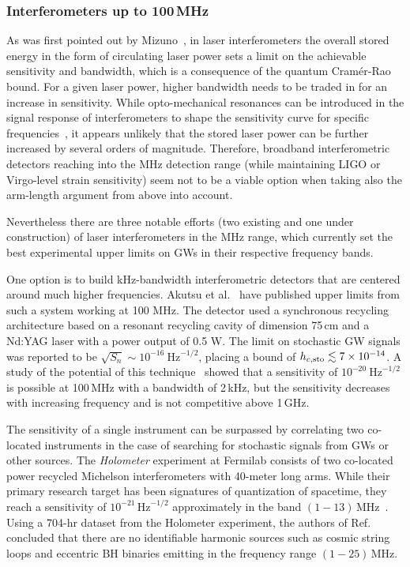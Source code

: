 \documentclass[11pt,a4paper]{article}
\begin{document}
\subsubsection{Interferometers up to 100\,MHz}
\label{sec:100MHzInterferometers}

As was first pointed out by Mizuno~\cite{Mizuno}, in laser interferometers the overall stored energy in the form of circulating laser power sets a limit on the achievable sensitivity and bandwidth, which is a consequence of the quantum Cram\'{e}r-Rao bound. For a given laser power, higher bandwidth needs to be traded in for an increase in sensitivity. While opto-mechanical resonances can be introduced in the signal response of interferometers to shape the sensitivity curve for specific frequencies~\cite{Somiya:2016pla,Korobko:2018pla}, it appears unlikely that the stored laser power can be further increased by several orders of magnitude. Therefore, broadband interferometric detectors reaching into the MHz detection range (while maintaining LIGO or Virgo-level strain sensitivity) seem not to be a viable option when taking also the arm-length argument from above into account.

Nevertheless there are three notable efforts (two existing and one under construction) of laser interferometers in the MHz range, which currently set the best experimental upper limits on GWs in their respective frequency bands.

One option is to build kHz-bandwidth interferometric detectors that are centered around much higher frequencies. Akutsu et al.~\cite{akutsu} have published upper limits from such a system working at 100 MHz. The detector used a synchronous recycling architecture based on a resonant recycling cavity of dimension 75\,cm and a Nd:YAG laser with a power output of 0.5 W. The limit on stochastic GW signals was reported to be $\sqrt{S_n} \sim 10^{-16}~\text{Hz}^{-1/2}$, placing a bound of $h_{c,\rm sto} \lesssim 7 \times 10^{-14}$. A study of the potential of this technique~\cite{Nishizawa} showed that a sensitivity of $10^{-20}~\text{Hz}^{-1/2}$ is possible at 100\,MHz with a bandwidth of 2\,kHz, but the sensitivity decreases with increasing frequency and is not competitive above 1\,GHz.

The sensitivity of a single instrument can be surpassed by correlating two co-located instruments in the case of searching for stochastic signals from GWs or other sources.
The \emph{Holometer} experiment at Fermilab consists of two co-located power recycled Michelson interferometers with 40-meter long arms. While their primary research target has been signatures of quantization of spacetime, they reach a sensitivity of $10^{-21} \, \text{Hz}^{-1/2}$ approximately in the band $(1-13)\,$MHz~\cite{PhysRevD.95.063002}. Using a 704-hr dataset from the Holometer experiment, the authors of Ref.~\cite{Martinez:2020cdh} concluded that there are no identifiable harmonic sources such as cosmic string loops and eccentric BH binaries emitting in the frequency range $(1-25) \, \text{MHz}$.
\end{document}
